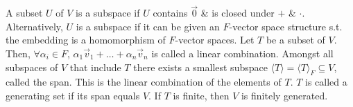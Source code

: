  A subset $U$ of $V$ is a subspace if $U$ contains $\vec{0}$ \& is closed under $+$ \& $\cdot$. Alternatively, $U$ is a subspace if it can be given an $F$-vector space structure s.t. the embedding is a homomorphism of $F$-vector spaces.
 Let $T$ be a subset of $V$. Then, $\forall \alpha_{i} \in F$, $\alpha_{1}\vec{v}_{1} + \dots + \alpha_{n}\vec{v}_{n}$ is called a linear combination.
 Amongst all subspaces of $V$ that include $T$ there exists a smallest subspace $\langle T \rangle = \langle T \rangle_{F} \subseteq V$, called the span. This is the linear combination of the elements of $T$.
 $T$ is called a generating set if its span equals $V$. If $T$ is finite, then $V$ is finitely generated.
